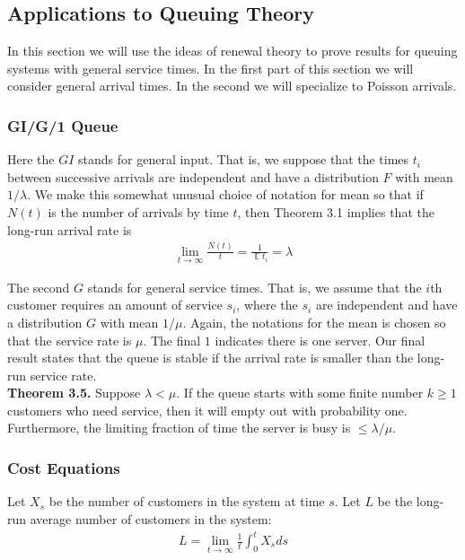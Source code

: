\documentclass[12pt]{article}
\DeclareMathOperator*{\E}{\mathbb{E}}
\begin{document}

\subsection{Applications to Queuing Theory}

In this section we will use the ideas of renewal theory to prove results for queuing systems with general service times. In the first part of this section we will consider general arrival times. In the second we will specialize to Poisson arrivals.


\subsubsection{GI/G/1 Queue}

Here the $GI$ stands for general input. That is, we suppose that the times $t_i$ between successive arrivals are independent and have a distribution $F$ with mean $1/\lambda$. We make this somewhat unusual choice of notation for mean so that if $N(t)$ is the number of arrivals by time $t$, then Theorem 3.1 implies that the long-run arrival rate is
\begin{align*}
\lim_{t \to \infty} \frac{N(t)}{t} = \frac{1}{\E t_i} = \lambda
\end{align*}

The second $G$ stands for general service times. That is, we assume that the $i$th customer requires an amount of service $s_i$, where the $s_i$ are independent and have a distribution $G$ with mean $1/\mu$. Again, the notations for the mean is chosen so that the service rate is $\mu$. The final $1$ indicates there is one server. Our final result states that the queue is stable if the arrival rate is smaller than the long-run service rate.\\

\textbf{Theorem 3.5.} Suppose $\lambda < \mu$. If the queue starts with some finite number $k \geq 1$ customers who need service, then it will empty out with probability one. Furthermore, the limiting fraction of time the server is busy is $\leq \lambda/\mu$.


\subsubsection{Cost Equations}

Let $X_s$ be the number of customers in the system at time $s$. Let $L$ be the long-run average number of customers in the system:
\begin{align*}
L = \lim_{t \to \infty} \frac{1}{t} \int_0^t X_s ds
\end{align*}
\end{document}
